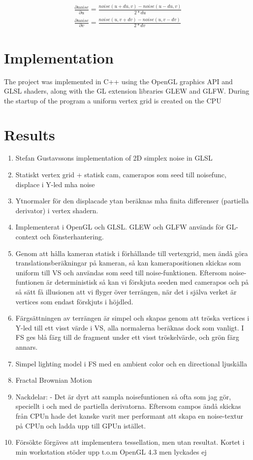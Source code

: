 \documentclass[12pt]{article}
\begin{document}
\begin{equation}
\begin{split}
\frac{\partial noise}{\partial u} = \frac{noise(u+du, v)-noise(u-du,v)}{2*du} \\
\frac{\partial noise}{\partial v} = \frac{noise(u, v+dv)-noise(u,v-dv)}{2*dv}
\label{eq:normals}
\end{split}
\end{equation}

\section{Implementation}
The project was implemented in C++ using the OpenGL graphics API and GLSL shaders, along with the GL extension libraries GLEW and GLFW. During the startup of the program a uniform vertex grid is created on the CPU
\section{Results}
\begin{enumerate}
  \item Stefan Gustavssons implementation of 2D simplex noise in GLSL
  \item Statiskt vertex grid + statisk cam, camerapos som seed till noisefunc, displace i Y-led mha noise
  \item Ytnormaler för den displacade ytan beräknas mha finita differenser (partiella derivator) i vertex shadern.
  \item Implementerat i OpenGL och GLSL. GLEW och GLFW används för GL-context och fönsterhantering.
  \item Genom att hålla kameran statisk i förhållande till vertexgrid, men ändå göra translationsberäkningar på kameran,  så kan kamerapositionen skickas som uniform till VS och användas som seed till noise-funktionen. Eftersom noise-funtionen är deterministisk så kan vi förskjuta seeden med camerapos och på så sätt få illusionen att vi flyger över terrängen, när det i själva verket är vertices som endast förskjuts i höjdled.
  \item Färgsättningen av terrängen är simpel och skapas genom att tröska vertices i Y-led till ett visst värde i VS, alla normalerna beräknas dock som vanligt. I FS ges blå färg till de fragment under ett visst tröskelvärde, och grön färg annars.
  \item Simpel lighting model i FS med en ambient color och en directional ljuskälla
  \item Fractal Brownian Motion
  \item Nackdelar: - Det är dyrt att sampla noisefuntionen så ofta som jag gör, speciellt i och med de partiella derivatorna. Eftersom campos ändå skickas från CPUn hade det kanske varit mer performant att skapa en noise-textur på CPUn och ladda upp till GPUn istället.
  \item Försökte förgäves att implementera tessellation, men utan resultat. Kortet i min workstation stöder upp t.o.m OpenGL 4.3 men lyckades ej 
\end{enumerate}
\end{document}
